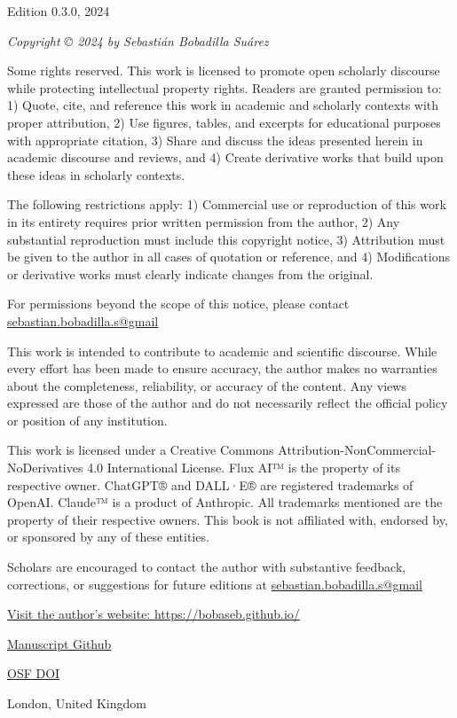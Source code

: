 \thispagestyle{empty}
\begin{center}
    \vspace*{\fill}
    Edition 0.3.0, 2024
    
    \textit{Copyright © 2024 by Sebastián Bobadilla Suárez}

Some rights reserved. This work is licensed to promote open scholarly discourse while protecting intellectual property rights. Readers are granted permission to: 1) Quote, cite, and reference this work in academic and scholarly contexts with proper attribution, 2) Use figures, tables, and excerpts for educational purposes with appropriate citation, 3) Share and discuss the ideas presented herein in academic discourse and reviews, and 4) Create derivative works that build upon these ideas in scholarly contexts.

The following restrictions apply: 1) Commercial use or reproduction of this work in its entirety requires prior written permission from the author, 2) Any substantial reproduction must include this copyright notice, 3) Attribution must be given to the author in all cases of quotation or reference, and 4) Modifications or derivative works must clearly indicate changes from the original.

For permissions beyond the scope of this notice, please contact \href{mailto:sebastian.bobadilla.s@gmail.com}{sebastian.bobadilla.s@gmail}

This work is intended to contribute to academic and scientific discourse. While every effort has been made to ensure accuracy, the author makes no warranties about the completeness, reliability, or accuracy of the content. Any views expressed are those of the author and do not necessarily reflect the official policy or position of any institution.

This work is licensed under a Creative Commons Attribution-NonCommercial-NoDerivatives 4.0 International License. Flux AI™ is the property of its respective owner. ChatGPT® and DALL·E® are registered trademarks of OpenAI. Claude™ is a product of Anthropic. All trademarks mentioned are the property of their respective owners. This book is not affiliated with, endorsed by, or sponsored by any of these entities.

Scholars are encouraged to contact the author with substantive feedback, corrections, or suggestions for future editions at \href{mailto:sebastian.bobadilla.s@gmail.com}{sebastian.bobadilla.s@gmail}

    \href{https://bobaseb.github.io/}{Visit the author's website: https://bobaseb.github.io/}

    \href{https://github.com/bobaseb/energetically-coherent-computation}{Manuscript Github}

    \href{https://doi.org/10.17605/OSF.IO/42GXN}{OSF DOI}
    
    London, United Kingdom
    \vspace*{\fill}
\end{center}
